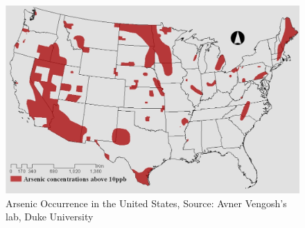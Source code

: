 \documentclass[12pt,]{article}
\begin{document}
\begin{figure}
\centering
\includegraphics{../Data/Processed/ArsenicFigure.png}
\caption{Arsenic Occurrence in the United States, Source: Avner
Vengosh's lab, Duke University}
\end{figure}
\end{document}
